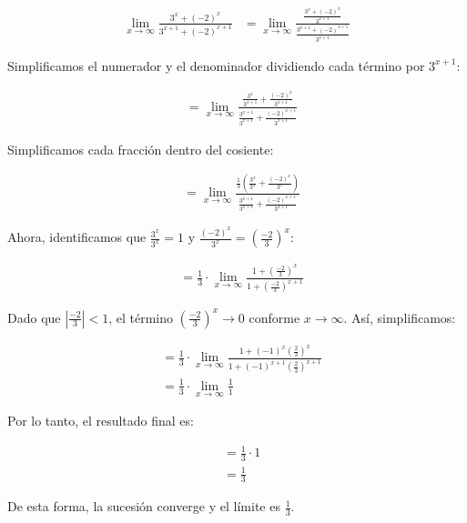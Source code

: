 \documentclass{article}
\begin{document}
    \begin{align*}
    \lim _{x \rightarrow \infty} \frac{3^{x}+(-2)^{x}}{3^{x+1}+(-2)^{x+1}}
    & =\lim _{x \rightarrow \infty} \frac{\frac{3^{x}+(-2)^{x}}{3^{x+1}}}{\frac{3^{x+1}+(-2)^{x+1}}{3^{x+1}}}
    \end{align*}

    Simplificamos el numerador y el denominador dividiendo cada término por \(3^{x+1}\):

    \begin{align*}
    & =\lim _{x \rightarrow \infty} \frac{\frac{3^{x}}{3^{x+1}}+\frac{(-2)^{x}}{3^{x+1}}}{\frac{3^{x+1}}{3^{x+1}}+\frac{(-2)^{x+1}}{3^{x+1}}}
    \end{align*}

    Simplificamos cada fracción dentro del cosiente:

    \begin{align*}
    & =\lim _{x \rightarrow \infty} \frac{\frac{1}{3}\left(\frac{3^{x}}{3^{x}}+\frac{(-2)^{x}}{3^{x}}\right)}{\frac{3^{x+1}}{3^{x+1}}+\frac{(-2)^{x+1}}{3^{x+1}}}
    \end{align*}

    Ahora, identificamos que \(\frac{3^{x}}{3^{x}} = 1\) y \(\frac{(-2)^{x}}{3^{x}} = \left(\frac{-2}{3}\right)^x\):

    \begin{align*}
    & =\frac{1}{3} \cdot \lim _{x \rightarrow \infty} \frac{1+\left(\frac{-2}{3}\right)^{x}}{1+\left(\frac{-2}{3}\right)^{x+1}}
    \end{align*}

    Dado que \(\left|\frac{-2}{3}\right| < 1\), el término \(\left( \frac{-2}{3} \right)^x \to 0\) conforme \(x \to \infty\). Así, simplificamos:

    \begin{align*}
    & =\frac{1}{3} \cdot \lim _{x \rightarrow \infty} \frac{1+(-1)^{x}\left(\frac{2}{3}\right)^{x}}{1+(-1)^{x+1}\left(\frac{2}{3}\right)^{x+1}} \\
    & =\frac{1}{3} \cdot \lim _{x \rightarrow \infty} \frac{1}{1}
    \end{align*}

    Por lo tanto, el resultado final es:

    \begin{align*}
    & =\frac{1}{3} \cdot 1 \\
    & =\frac{1}{3}
    \end{align*}

    De esta forma, la sucesión converge y el límite es \(\frac{1}{3}\).
\end{document}

